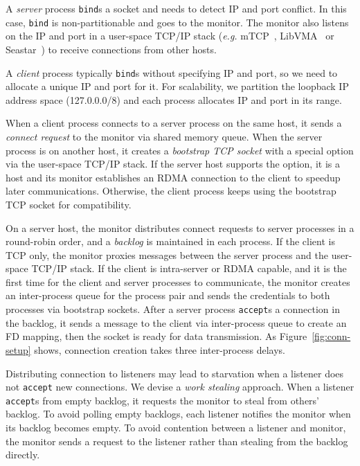 \iffalse

A \emph{server} process \texttt{bind}s a socket and needs to detect IP and port conflict. In this case, \texttt{bind} is non-partitionable and goes to the monitor. The monitor also listens on the IP and port in a user-space TCP/IP stack (\textit{e.g.} mTCP~\cite{jeong2014mtcp}, LibVMA~\cite{libvma} or Seastar~\cite{seastar}) to receive connections from other hosts.

A \emph{client} process typically \texttt{bind}s without specifying IP and port, so we need to allocate a unique IP and port for it. For scalability, we partition the loopback IP address space (127.0.0.0/8) and each process allocates IP and port in its range.

When a client process connects to a server process on the same host, it sends a \textit{connect request} to the monitor via shared memory queue. When the server process is on another host, it creates a \textit{bootstrap TCP socket} with a special option via the user-space TCP/IP stack. If the server host supports the option, it is a \sys host and its monitor establishes an RDMA connection to the client to speedup later communications. Otherwise, the client process keeps using the bootstrap TCP socket for compatibility.

On a server host, the monitor distributes connect requests to server processes in a round-robin order, and a \textit{backlog} is maintained in each process. If the client is TCP only, the monitor proxies messages between the server process and the user-space TCP/IP stack. If the client is intra-server or RDMA capable, and it is the first time for the client and server processes to communicate, the monitor creates an inter-process queue for the process pair and sends the credentials to both processes via bootstrap sockets. After a server process \texttt{accept}s a connection in the backlog, it sends a message to the client via inter-process queue to create an FD mapping, then the socket is ready for data transmission. As Figure~\ref{fig:conn-setup} shows, connection creation takes three inter-process delays.

Distributing connection to listeners may lead to starvation when a listener does not \texttt{accept} new connections. We devise a \textit{work stealing} approach. When a listener \texttt{accept}s from empty backlog, it requests the monitor to steal from others' backlog. To avoid polling empty backlogs, each listener notifies the monitor when its backlog becomes empty. To avoid contention between a listener and monitor, the monitor sends a request to the listener rather than stealing from the backlog directly.

